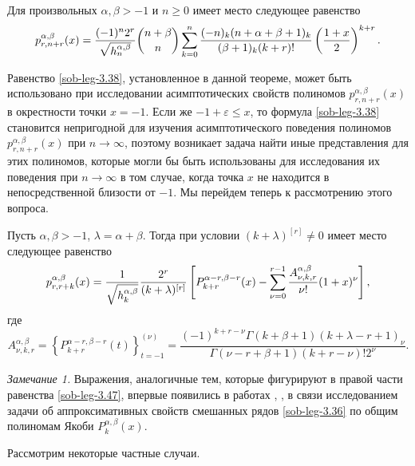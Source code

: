 \begin{theorem} Для произвольных $\alpha, \beta>-1$ и $n\ge0$
имеет место следующее равенство
\begin{equation}\label{sob-leg-3.38}%
p_{r,n+r}^{\alpha,\beta}(x)=\frac{(-1)^n2^{r}}{\sqrt{ h_n^{\alpha,\beta}}}
{n+\beta\choose n}
\sum_{k=0}^n{(-n)_k(n+\alpha+\beta+1)_k\over (\beta+1)_k(k+r)!}
\left({1+x\over 2}\right)^{k+r}.
\end{equation}
\end{theorem}

Равенство \eqref{sob-leg-3.38}, установленное в данной теореме, может быть использовано при исследовании асимптотических свойств полиномов $p_{r,n+r}^{\alpha,\beta}(x)$ в окрестности точки $x=-1$. Если же $-1+\varepsilon\le x$, то формула  \eqref{sob-leg-3.38} становится непригодной для изучения асимптотического  поведения полиномов  $p_{r,n+r}^{\alpha,\beta}(x)$ при $n\to\infty$, поэтому возникает задача найти иные представления для этих полиномов, которые могли бы быть использованы для исследования их поведения при $n\to\infty$ в том случае, когда точка $x$ не находится в непосредственной близости от $-1$. Мы перейдем теперь к рассмотрению этого вопроса.
\begin{theorem} Пусть $\alpha, \beta>-1$, $\lambda=\alpha+\beta$. Тогда  при условии $(k+\lambda)^{[r]}\neq0$ имеет место следующее равенство
\begin{equation}\label{sob-leg-3.47}
p_{r,r+k}^{\alpha,\beta}(x) ={1\over\sqrt{ h_k^{\alpha,\beta}}}
\frac{2^r}{(k+\lambda)^{[r]}}\left[P_{k+r}^{\alpha-r,\beta-r}(x)
-\sum^{r-1}_{\nu=0}\frac{A_{\nu,k,r}^{\alpha,\beta}}{\nu!}(1+x)^{\nu}\right] ,
\end{equation}
где
\begin{equation}\label{sob-leg-3.45}
A_{\nu,k,r}^{\alpha,\beta}=\left\{P_{k+r}^{\alpha-r,\beta-r}(t)\right\}_{t=-1}^{(\nu)}=
\frac{(-1)^{k+r-\nu}\Gamma(k+\beta+1)(k+\lambda-r+1)_{\nu}}
{\Gamma(\nu-r+\beta+1)(k+r-\nu)!2^\nu}.
\end{equation}
\end{theorem}


 \textit{Замечание 1.} Выражения, аналогичные тем, которые фигурируют в правой части равенства  \eqref{sob-leg-3.47}, впервые появились в   работах \cite{Haar-Tcheb-Shar13}, \cite{sob-leg-Shar17}, \cite{Haar-Tcheb-Shar18} в связи исследованием задачи об аппроксимативных свойств смешанных рядов \eqref{sob-leg-3.36} по общим полиномам Якоби $P_{k}^{\alpha,\beta}(x)$.

  Рассмотрим некоторые частные случаи.

